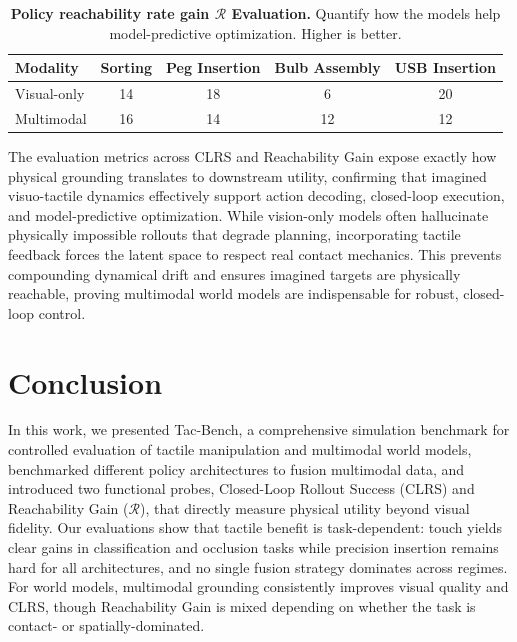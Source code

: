 \documentclass{article}
\begin{document}
\vspace{-1em}
\begin{table}[h]
    \centering
    \caption{\small \textbf{Policy reachability rate gain $\mathcal{R}$ Evaluation.} Quantify how the models help model-predictive optimization. Higher is better.}
    \vspace{0.5em}
    \small
    \begin{tabular}{lcccc}
        \hline
        \textbf{Modality} & \textbf{Sorting} & \textbf{Peg Insertion} & \textbf{Bulb Assembly} & \textbf{USB Insertion} \\
        \hline
        Visual-only       & 14 & 18 & 6 & 20 \\
        Multimodal      & 16 & 14 & 12 & 12 \\
        \hline
    \end{tabular}
    \label{tab:reachability-evaluation}
\end{table}

The evaluation metrics across CLRS and Reachability Gain expose exactly how physical grounding translates to downstream utility, confirming that imagined visuo-tactile dynamics effectively support action decoding, closed-loop execution, and model-predictive optimization. While vision-only models often hallucinate physically impossible rollouts that degrade planning, incorporating tactile feedback forces the latent space to respect real contact mechanics. This prevents compounding dynamical drift and ensures imagined targets are physically reachable, proving multimodal world models are indispensable for robust, closed-loop control.


\section{Conclusion}
\label{sec:conclusion}

In this work, we presented Tac-Bench, a comprehensive simulation benchmark for controlled evaluation of tactile manipulation and multimodal world models, benchmarked different policy architectures to fusion multimodal data, and introduced two functional probes, Closed-Loop Rollout Success (CLRS) and Reachability Gain ($\mathcal{R}$), that directly measure physical utility beyond visual fidelity. Our evaluations show that tactile benefit is task-dependent: touch yields clear gains in classification and occlusion tasks while precision insertion remains hard for all architectures, and no single fusion strategy dominates across regimes. For world models, multimodal grounding consistently improves visual quality and CLRS, though Reachability Gain is mixed depending on whether the task is contact- or spatially-dominated.
\end{document}

